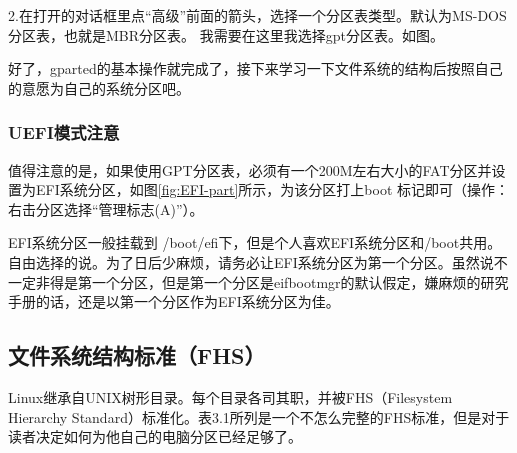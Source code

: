 \documentclass[amstex,twoside]{ctexbook}
\begin{document}
\indent2.在打开的对话框里点“高级”前面的箭头，选择一个分区表类型。默认为MS-DOS分区表，也就是MBR分区表。
我需要在这里我选择gpt分区表。如图。

好了，gparted的基本操作就完成了，接下来学习一下文件系统的结构后按照自己的意愿为自己的系统分区吧。

\FloatBarrier

\subsubsection*{UEFI模式注意}

值得注意的是，如果使用GPT分区表，必须有一个200M左右大小的FAT分区并设置为EFI系统分区，如图\ref{fig:EFI-part}所示，为该分区打上boot 标记即可（操作：右击分区选择“管理标志(A)”）。

EFI系统分区一般挂载到 /boot/efi下，但是个人喜欢EFI系统分区和/boot共用。自由选择的说。为了日后少麻烦，请务必让EFI系统分区为第一个分区。虽然说不一定非得是第一个分区，但是第一个分区是eifbootmgr的默认假定，嫌麻烦的研究手册的话，还是以第一个分区作为EFI系统分区为佳。


\FloatBarrier

\subsection{文件系统结构标准（FHS）}

Linux继承自UNIX树形目录。每个目录各司其职，并被FHS（Filesystem Hierarchy Standard）标准化。表3.1所列是一个不怎么完整的FHS标准，但是对于读者决定如何为他自己的电脑分区已经足够了。
\end{document}
